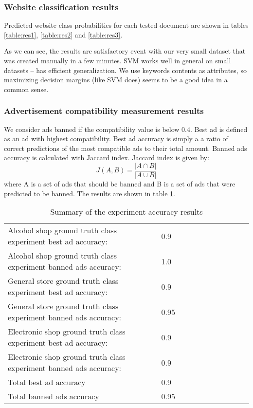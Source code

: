 \documentclass[a4paper]{article}
\begin{document}
\subsubsection {Website classification results}
Predicted website class probabilities for each tested document are shown in
tables
\ref{table:res1},
\ref{table:res2} and
\ref{table:res3}.

As we can see, the results are satisfactory event with our very small dataset
that was created manually in a few minutes.
SVM works well in general on small datasets -- has efficient generalization.
We use keywords contents as attributes, so maximizing decision margins (like SVM does)
seems to be a good idea in a common sense.

\subsubsection {Advertisement compatibility measurement results}
We consider ads banned if the compatibility value is below 0.4.
Best ad is defined as an ad with highest compatibility.
Best ad accuracy is simply a a ratio of correct predictions
of the most compatible ads to their total amount.
Banned ads accuracy is calculated with Jaccard index.
Jaccard index is given by:
\begin{equation}
    J(A,B) = \frac{|A\cap B|}{|A\cup B|}
\end{equation}
where A is a set of ads that should be banned and B is a set of ads that were predicted to be banned.
The results are shown in table \ref{table:testResults}.


\begin{table}[!hbt]
    \caption{ Summary of the experiment accuracy results
    \label{table:testResults}
    }
\footnotesize
\begin{center}
    \begin{tabular}{|l|l|l|l|l|l|l|l|l|l|l|}
    \hline
        Alcohol shop ground truth class experiment best ad accuracy:  &
        0.9 \\
        Alcohol shop ground truth class experiment banned ads accuracy: &
        1.0 \\
    \hline
        General store ground truth class experiment best ad accuracy: &
        0.9 \\
        General store ground truth class experiment banned ads accuracy: &
        0.95 \\
    \hline
        Electronic shop ground truth class experiment best ad accuracy: &
        0.9 \\
        Electronic shop ground truth class experiment banned ads accuracy: &
        0.9 \\
    \hline
        Total best ad accuracy & 0.9 \\
        Total banned ads accuracy & 0.95 \\
    \hline
    \end{tabular}
\end{center}
\end{table}
\end{document}

